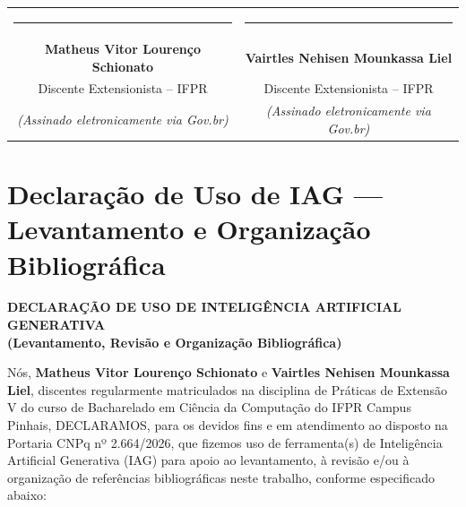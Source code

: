 \bigskip\bigskip
\noindent
\begin{center}
\begin{tabular}{cc}
\rule{6.5cm}{0.5pt} & \rule{6.5cm}{0.5pt} \\
\textbf{Matheus Vitor Lourenço Schionato} & \textbf{Vairtles Nehisen Mounkassa Liel} \\
Discente Extensionista -- IFPR & Discente Extensionista -- IFPR \\
\footnotesize\textit{(Assinado eletronicamente via Gov.br)} & \footnotesize\textit{(Assinado eletronicamente via Gov.br)}
\end{tabular}
\end{center}

\bigskip
\begin{center}
\end{center}


\newpage
\section{Declaração de Uso de IAG --- Levantamento e Organização Bibliográfica}
\label{ap:declaracao_revisao_bibliografia}

\begin{center}
\textbf{\large DECLARAÇÃO DE USO DE INTELIGÊNCIA ARTIFICIAL GENERATIVA}\\
\textbf{(Levantamento, Revisão e Organização Bibliográfica)}
\end{center}

\bigskip
\noindent
Nós, \textbf{Matheus Vitor Lourenço Schionato} e \textbf{Vairtles Nehisen Mounkassa Liel}, discentes regularmente matriculados na disciplina de Práticas de Extensão V do curso de Bacharelado em Ciência da Computação do IFPR Campus Pinhais, DECLARAMOS, para os devidos fins e em atendimento ao disposto na Portaria CNPq nº 2.664/2026, que fizemos uso de ferramenta(s) de Inteligência Artificial Generativa (IAG) para apoio ao levantamento, à revisão e/ou à organização de referências bibliográficas neste trabalho, conforme especificado abaixo:

